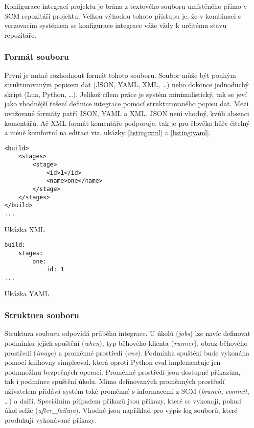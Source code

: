 Konfigurace integrací projektu je brána z textového souboru umístěného přímo v SCM repozitáři projektu.
Velkou výhodou tohoto přístupu je, že v kombinaci s verzovacím systémem se konfigurace integrace váže vždy k určitému stavu repozitáře.

\subsubsection{Formát souboru}

První je nutné rozhodnout formát tohoto souboru.
Soubor může být pouhým strukturovaným popisem dat (JSON, YAML, XML, \ldots) nebo dokonce jednoduchý skript (Lua, Python, \ldots).
Jelikož cílem práce je systém minimalistický, tak se jeví jako vhodnější řešení definice integrace pomocí strukturovaného popisu dat.
Mezi uvažované formáty patří JSON, YAML a XML.
JSON není vhodný, kvůli absenci komentářů.
Ač XML formát komentáře podporuje, tak je pro člověka hůře čitelný a méně komfortní na editaci viz. ukázky \ref{listing:xml} a \ref{listing:yaml}.

\begin{listing}[ht]
\begin{verbatim}
<build>
    <stages>
        <stage>
            <id>1</id>
            <name>one</name>
        </stage>
    </stages>
</build>
...
\end{verbatim}
\caption{Ukázka XML}
\label{listing:xml}
\end{listing}

\begin{listing}[ht]
\begin{verbatim}
build:
    stages:
        one:
            id: 1
...
\end{verbatim}
\caption{Ukázka YAML}
\label{listing:yaml}
\end{listing}

\subsubsection{Struktura souboru}

Struktura souboru odpovídá průběhu integrace.
U úkolů (\textit{jobs}) lze navíc definovat podmínku jejich spuštění (\textit{when}), typ běhového klienta (\textit{runner}), obraz běhového prostředí (\textit{image}) a proměnné prostředí (\textit{env}).
Podmínka spuštění bude vykonána pomocí knihovny simpleeval, která oproti Python eval implementuje jen podmnožinu bezpečných operací.
Proměnné prostředí jsou dostupné příkazům, tak i podmínce spuštění úkolu.
Mimo definovaných proměnných prostředí uživatelem přidává systém také proměnné s informacemi z SCM (\textit{branch}, \textit{commit}, \ldots) a další.
Speciálním případem příkazů jsou příkazy, které se vykonají, pokud úkol selže (\textit{after\_failure}).
Vhodné jsou například pro výpis log souborů, které produkují vykonávané příkazy.

